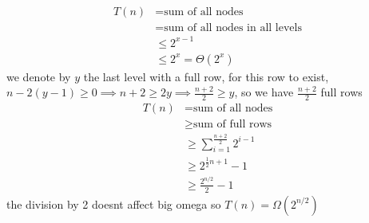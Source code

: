 \documentclass[a4paper,12pt]{article}
\begin{document}
\begin{my_example}
\begin{align*}
  T(n) &= \text{sum of all nodes}\\
  &= \text{sum of all nodes in all levels}\\
  &\le 2^{x-1}\\
  &\le 2^{x} = \Theta(2^x)
\end{align*}
we denote by \(y\) the last level with a full row, for this row to exist, \(n-2(y-1) \ge 0 \implies n+2 \ge 2y \implies \frac{n+2}{2} \ge y\), so we have \(\frac{n+2}{2}\) full rows\\[0pt]
\begin{align*}
  T(n) &= \text{sum of all nodes}\\
  &\ge \text{sum of full rows}\\
  &\ge \sum_{i=1}^{\frac{n+2}{2}} 2^{i-1}\\
  &\ge 2^{\frac12n+1}-1\\
  &\ge \frac{2^{n/2}}{2}-1
\end{align*}
the division by 2 doesnt affect big omega so \(T(n) = \Omega\left(2^{n/2}\right)\)\\[0pt]
\end{my_example}
\end{document}
